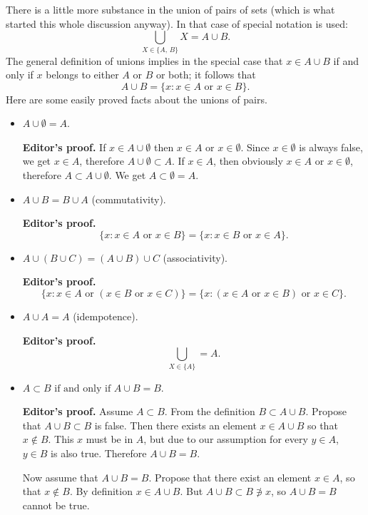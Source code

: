 There is a little more substance in the union of pairs of sets (which is what started this whole discussion anyway). In that case of special notation is used:
\[
	\bigcup_{X \in \{A, \, B\}} X = A \cup B.
\]
The general definition of unions implies in the special case that $x \in A \cup B$ if and only if $x$ belongs to either $A$ or $B$ or both; it follows that
\[
	A \cup B = \{ x : x \in A \text{ or } x \in B\}.
\]
Here are some easily proved facts about the unions of pairs.

\begin{itemize}
	\item $A \cup \emptyset = A$.
	
	\textbf{Editor's proof.} If $x \in A \cup \emptyset$ then $x \in A \text{ or } x \in \emptyset$. Since $x \in \emptyset$ is always false, we get $x \in A$, therefore $A \cup \emptyset \subset A$. If $x \in A$, then obviously $x \in A \text{ or } x \in \emptyset$, therefore $A \subset A \cup \emptyset$. We get $A \subset \emptyset = A$.
	
	\item $A \cup B = B \cup A$ (commutativity).
	
	\textbf{Editor's proof.}
	\[
		\{ x : x \in A \text{ or } x \in B \} = \{ x : x \in B \text{ or } x \in A \}.
	\]
	\item $A \cup (B \cup C) = (A \cup B) \cup C$ (associativity).
	
	\textbf{Editor's proof.}
	\[
		\{ x : x \in A \text{ or } (x \in B \text{ or } x \in C) \} = \{ x : (x \in A \text{ or } x \in B) \text{ or } x \in C \}.
	\]
	
	\item $A \cup A = A$ (idempotence).
	
	\textbf{Editor's proof.}
	\[
	\bigcup_{X \in \{A\}} = A.
	\]
	
	\item $A \subset B \text{ if and only if } A \cup B = B$.
	
	\textbf{Editor's proof.} Assume $A \subset B$. From the definition $B \subset A \cup B$. Propose that $A \cup B \subset B$ is false. Then there exists an element $x \in A \cup B$ so that $x \not \in B$. This $x$ must be in $A$, but due to our assumption for every $y \in A$, $y \in B$ is also true. Therefore $A \cup B = B$.
	
	Now assume that $A \cup B = B$. Propose that there exist an element $x \in A$, so that $x \not \in B$. By definition $x \in A \cup B$. But $A \cup B \subset B \not \ni x$, so $A \cup B = B$ cannot be true.
\end{itemize}

